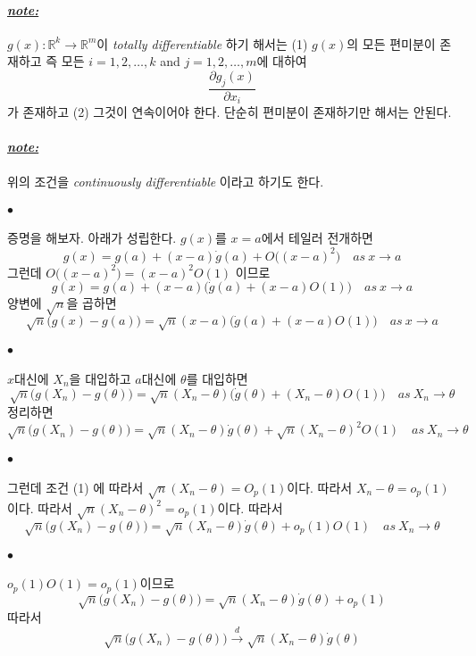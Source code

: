 \documentclass[12pt,oneside,english]{book}
\def\ck{\paragraph{\Large$\bullet$}\Large}
\def\note{\paragraph{\Large\textit{\underline{note:}}}\Large}
\begin{document}
\note $g(x):\mathbb{R}^{k}\to \mathbb{R}^{m}$이 \emph{totally differentiable} 하기 해서는 (1) $g(x)$의 모든 편미분이 존재하고 즉 모든 $i=1,2,\dots,k$ and $j=1,2,\dots, m$에 대하여 
\[
\frac{\partial g_j(x)}{\partial x_i}
\]
가 존재하고 (2) 그것이 연속이어야 한다. 단순히 편미분이 존재하기만 해서는 안된다. 

\note 위의 조건을 \emph{continuously differentiable} 이라고 하기도 한다. 

\ck 증명을 해보자. 아래가 성립한다. $g(x)$를 $x=a$에서 테일러 전개하면 
\[
g(x) = g(a) + (x-a)\dot{g}(a)+O\big((x-a)^2\big) \quad as ~ x\to a
\]
그런데 $O\big((x-a)^2\big)=(x-a)^2O(1)$ 이므로 
\[
g(x) = g(a) + (x-a)\big(\dot{g}(a)+(x-a)O(1)\big) \quad as ~ x \to a
\]
양변에 $\sqrt{n}$을 곱하면 
\[
\sqrt{n}\big({g(x) -g(a)}\big) = \sqrt{n}(x-a)\big(\dot{g}(a)+(x-a)O(1)\big) \quad as ~ x \to a
\]

\ck $x$대신에 $X_n$을 대입하고 $a$대신에 $\theta$를 대입하면 
\[
\sqrt{n}\big({g(X_n) -g(\theta)}\big) = \sqrt{n}(X_n-\theta)\big(\dot{g}(\theta)+(X_n-\theta)O(1)\big) \quad as ~ X_n \to \theta
\]
정리하면 
\[
\sqrt{n}\big({g(X_n) -g(\theta)}\big) = \sqrt{n}(X_n-\theta)\dot{g}(\theta)+\sqrt{n}(X_n-\theta)^2O(1) \quad as ~ X_n \to \theta
\]

\ck 그런데 조건 (1) 에 따라서 $\sqrt{n}(X_n-\theta)=O_p(1)$이다. 따라서 $X_n-\theta = o_p(1)$이다. 따라서 $\sqrt{n}(X_n-\theta)^2=o_p(1)$이다. 따라서 
\[
\sqrt{n}\big({g(X_n) -g(\theta)}\big) = \sqrt{n}(X_n-\theta)\dot{g}(\theta)+o_p(1)O(1) \quad as ~ X_n \to \theta
\]

\ck $o_p(1)O(1)=o_p(1)$이므로 
\[
\sqrt{n}\big({g(X_n) -g(\theta)}\big) = \sqrt{n}(X_n-\theta)\dot{g}(\theta)+o_p(1) 
\]
따라서 
\[
\sqrt{n}\big({g(X_n) -g(\theta)}\big) \overset{d}{\to} \sqrt{n}(X_n-\theta)\dot{g}(\theta)
\]
\end{document}
